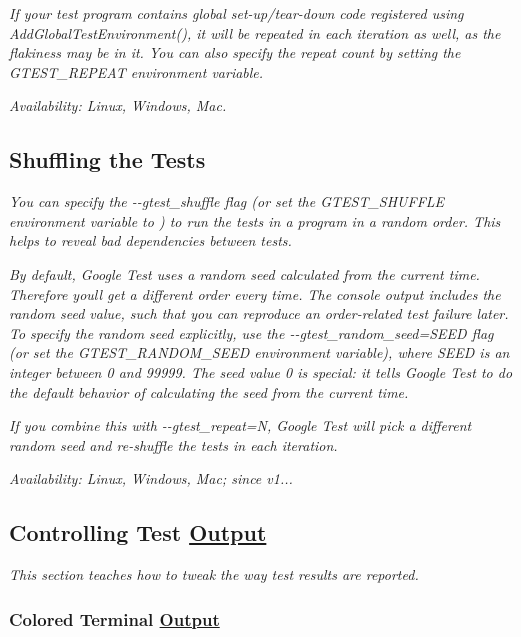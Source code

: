 {\itshape If your test program contains global set-\/up/tear-\/down code registered using {\ttfamily Add\+Global\+Test\+Environment()}, it will be repeated in each iteration as well, as the flakiness may be in it. You can also specify the repeat count by setting the {\ttfamily G\+T\+E\+S\+T\+\_\+\+R\+E\+P\+E\+AT} environment variable.}

{\itshape {\itshape Availability\+:} Linux, Windows, Mac.}

{\itshape \subsection*{Shuffling the Tests}}

{\itshape }

{\itshape You can specify the {\ttfamily -\/-\/gtest\+\_\+shuffle} flag (or set the {\ttfamily G\+T\+E\+S\+T\+\_\+\+S\+H\+U\+F\+F\+LE} environment variable to {}) to run the tests in a program in a random order. This helps to reveal bad dependencies between tests.}

{\itshape By default, Google Test uses a random seed calculated from the current time. Therefore you\textquotesingle{}ll get a different order every time. The console output includes the random seed value, such that you can reproduce an order-\/related test failure later. To specify the random seed explicitly, use the {\ttfamily -\/-\/gtest\+\_\+random\+\_\+seed=S\+E\+ED} flag (or set the {\ttfamily G\+T\+E\+S\+T\+\_\+\+R\+A\+N\+D\+O\+M\+\_\+\+S\+E\+ED} environment variable), where {\ttfamily S\+E\+ED} is an integer between 0 and 99999. The seed value 0 is special\+: it tells Google Test to do the default behavior of calculating the seed from the current time.}

{\itshape If you combine this with {\ttfamily -\/-\/gtest\+\_\+repeat=N}, Google Test will pick a different random seed and re-\/shuffle the tests in each iteration.}

{\itshape {\itshape Availability\+:} Linux, Windows, Mac; since v1...}

{\itshape \subsection*{Controlling Test \mbox{\hyperlink{class_output}{Output}}}}

{\itshape }

{\itshape This section teaches how to tweak the way test results are reported.}

{\itshape \subsubsection*{Colored Terminal \mbox{\hyperlink{class_output}{Output}}}}

